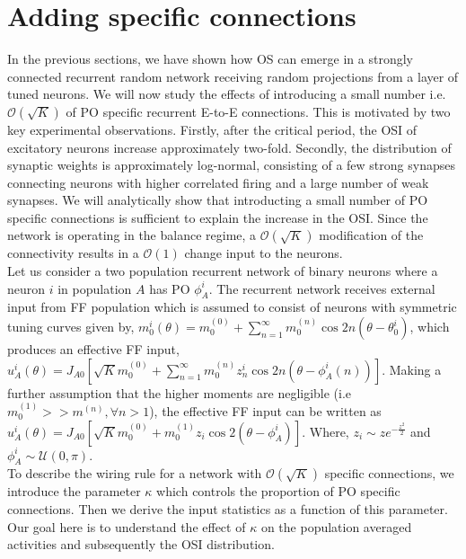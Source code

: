 \section{\label{sec:specific_con}Adding specific connections}
In the previous sections, we have shown how OS can emerge in a strongly connected recurrent random network receiving random projections from a layer of tuned neurons. We will now study the effects of introducing a small number i.e. $\mathcal{O} (\sqrt{K})$ of PO specific recurrent E-to-E connections. This is motivated by two key experimental observations. Firstly, after the critical period, the OSI of excitatory neurons increase approximately two-fold. Secondly, the distribution of synaptic weights is approximately log-normal, consisting of a few strong synapses connecting neurons with higher correlated firing and a large number of weak synapses. We will analytically show that introducting a small number of PO specific connections is sufficient to explain the increase in the OSI.  Since the network is operating in the balance regime, a $\mathcal{O} (\sqrt{K})$ modification of the connectivity results in a $\mathcal{O}(1)$ change input to the neurons. \\
Let us consider a two population recurrent network of binary neurons where a neuron $i$ in population $A$ has PO $\phi_A^i$. The recurrent network receives external input from FF population which is assumed to consist of neurons with symmetric tuning curves given by, $m^i_0(\theta) = m^{(0)}_0 + \sum_{n=1}^{\infty} m^{(n)}_0 \cos 2n (\theta - \theta_0^i)$, which produces an effective FF input, $u_A^i(\theta) =  J_{A0}  [\sqrt{K} m_0^{(0)} + \sum_{n=1}^{\infty} m^{(n)}_0  z_n^i \cos2 n (\theta - \phi_A^i(n))]$. Making a further assumption that the higher moments are negligible (i.e $m^{(1)}_0 >> m^{(n)}, \forall n > 1$), the effective FF input can be written as $u_A^i(\theta) =  J_{A0}  [\sqrt{K} m_0^{(0)} + m_0^{(1)}z_i \cos2 (\theta - \phi_A^i)]$. Where,  $z_i \sim z e^{-\frac{z^2}{2}}$ and $\phi_A^i \sim \mathcal{U}(0, \pi)$. \\
To describe the wiring rule for a network with $\mathcal{O} (\sqrt{K})$ specific connections, we introduce the parameter $\kappa$ which controls the proportion of PO specific connections. Then we derive the input statistics as a function of this parameter. Our goal here is to understand the effect of $\kappa$ on the population averaged activities and subsequently the OSI distribution. 
